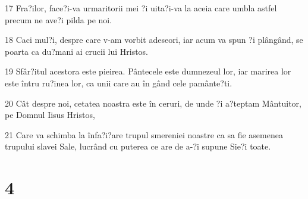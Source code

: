 \par 17 Fra?ilor, face?i-va urmaritorii mei ?i uita?i-va la aceia care umbla astfel precum ne ave?i pilda pe noi.
\par 18 Caci mul?i, despre care v-am vorbit adeseori, iar acum va spun ?i plângând, se poarta ca du?mani ai crucii lui Hristos.
\par 19 Sfâr?itul acestora este pieirea. Pântecele este dumnezeul lor, iar marirea lor este întru ru?inea lor, ca unii care au în gând cele pamânte?ti.
\par 20 Cât despre noi, cetatea noastra este în ceruri, de unde ?i a?teptam Mântuitor, pe Domnul Iisus Hristos,
\par 21 Care va schimba la înfa?i?are trupul smereniei noastre ca sa fie asemenea trupului slavei Sale, lucrând cu puterea ce are de a-?i supune Sie?i toate.

\chapter{4}

